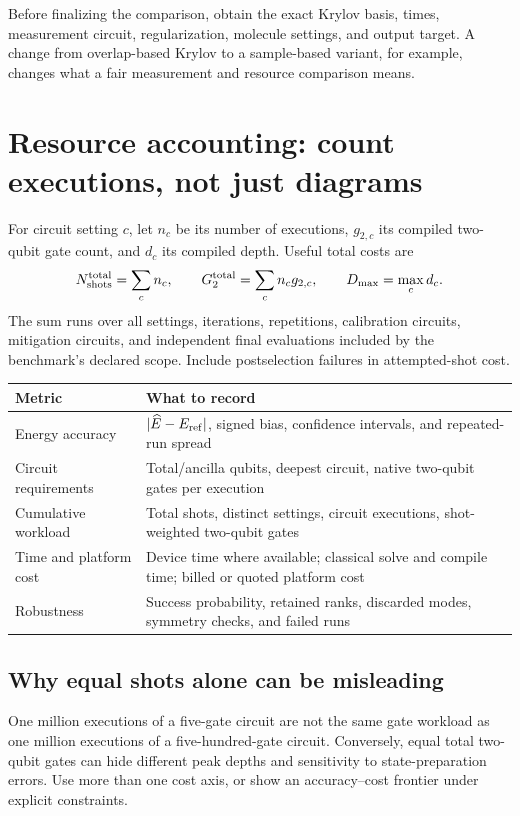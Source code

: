 \documentclass[11pt,a4paper]{article}
\newcommand{\lesson}[2]{\clearpage\section{#1}\label{#2}}
\begin{document}
\begin{caution}
Before finalizing the comparison, obtain the exact Krylov basis, times, measurement circuit, regularization, molecule settings, and output target. A change from overlap-based Krylov to a sample-based variant, for example, changes what a fair measurement and resource comparison means.
\end{caution}

\lesson{Resource accounting: count executions, not just diagrams}{sec:resources}
For circuit setting $c$, let $n_c$ be its number of executions, $g_{2,c}$ its compiled two-qubit gate count, and $d_c$ its compiled depth. Useful total costs are
\[
N_{\rm shots}^{\rm total}=\sum_c n_c,\qquad
G_2^{\rm total}=\sum_c n_c g_{2,c},\qquad
D_{\max}=\max_c d_c.
\]
The sum runs over all settings, iterations, repetitions, calibration circuits, mitigation circuits, and independent final evaluations included by the benchmark's declared scope. Include postselection failures in attempted-shot cost.

\begin{tabularx}{\linewidth}{@{}p{3.5cm}X@{}}
\toprule
Metric & What to record\\\midrule
Energy accuracy & $|\widehat E-E_{\rm ref}|$, signed bias, confidence intervals, and repeated-run spread\\
Circuit requirements & Total/ancilla qubits, deepest circuit, native two-qubit gates per execution\\
Cumulative workload & Total shots, distinct settings, circuit executions, shot-weighted two-qubit gates\\
Time and platform cost & Device time where available; classical solve and compile time; billed or quoted platform cost\\
Robustness & Success probability, retained ranks, discarded modes, symmetry checks, and failed runs\\\bottomrule
\end{tabularx}

\subsection*{Why equal shots alone can be misleading}
One million executions of a five-gate circuit are not the same gate workload as one million executions of a five-hundred-gate circuit. Conversely, equal total two-qubit gates can hide different peak depths and sensitivity to state-preparation errors. Use more than one cost axis, or show an accuracy--cost frontier under explicit constraints.
\end{document}
